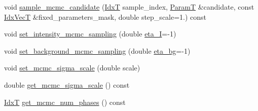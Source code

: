 \begin{DoxyCompactItemize}
\item 
void \hyperlink{classmappel_1_1MCMCAdaptor2Ds_ac9284f30a2b003b5e1381254029da4d1}{sample\+\_\+mcmc\+\_\+candidate} (\hyperlink{namespacemappel_ab17ec0f30b61ece292439d7ece81d3a8}{IdxT} sample\+\_\+index, \hyperlink{classmappel_1_1PointEmitterModel_a665ec6aea3aac139bb69a23c06d4b9a1}{ParamT} \&candidate, const \hyperlink{namespacemappel_ac63743dcd42180127307cd0e4ecdd784}{Idx\+VecT} \&fixed\+\_\+parameters\+\_\+mask, double step\+\_\+scale=1.) const 
\item 
void \hyperlink{classmappel_1_1MCMCAdaptor1D_ac70f768928859b1e9449b0ec1a141c4c}{set\+\_\+intensity\+\_\+mcmc\+\_\+sampling} (double \hyperlink{classmappel_1_1MCMCAdaptor1D_a5780d326be0c40e10d6c91777cfffbd3}{eta\+\_\+I}=-\/1)
\item 
void \hyperlink{classmappel_1_1MCMCAdaptor1D_ae79ee3845fbdd0e378f00eeebf8ccef1}{set\+\_\+background\+\_\+mcmc\+\_\+sampling} (double \hyperlink{classmappel_1_1MCMCAdaptor1D_af54c93421b8e298289cbb92743c6b3d5}{eta\+\_\+bg}=-\/1)
\item 
void \hyperlink{classmappel_1_1MCMCAdaptorBase_aa6b8eea136bf1f34f0c50bf8d1937a58}{set\+\_\+mcmc\+\_\+sigma\+\_\+scale} (double scale)
\item 
double \hyperlink{classmappel_1_1MCMCAdaptorBase_a9de5ee52bbf5c8fd3c1e3bd00836801a}{get\+\_\+mcmc\+\_\+sigma\+\_\+scale} () const 
\item 
\hyperlink{namespacemappel_ab17ec0f30b61ece292439d7ece81d3a8}{IdxT} \hyperlink{classmappel_1_1MCMCAdaptorBase_adb9997f1dc774f3a169c61cdb730a85f}{get\+\_\+mcmc\+\_\+num\+\_\+phases} () const 
\end{DoxyCompactItemize}
